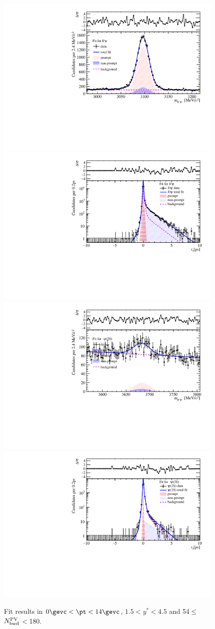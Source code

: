 \begin{figure}[H]
\begin{center}
\includegraphics[width=0.45\linewidth]{pdf/Pbp/BWorkdir/TwoDimFit/ProjMass/Jpsi_n5y1pt1.pdf}
\includegraphics[width=0.45\linewidth]{pdf/Pbp/BWorkdir/TwoDimFit/ProjTz/Jpsi_n5y1pt1.pdf}
\vspace*{-0.5cm}
\includegraphics[width=0.45\linewidth]{pdf/Pbp/BWorkdir/TwoDimFit/ProjMass/Psi2S_n5y1pt1.pdf}
\includegraphics[width=0.45\linewidth]{pdf/Pbp/BWorkdir/TwoDimFit/ProjTz/Psi2S_n5y1pt1.pdf}
\vspace*{-0.5cm}
\end{center}
\caption{Fit results in $0\gevc<\pt<14\gevc$, $1.5<y^*<4.5$ and 54$\leq$$N_{\rm bwd}^{\rm PV}$$<$180.}
\end{figure}
